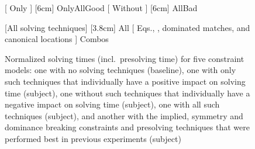 \begin{figure}
  \centering%

                      [%
                        Only %
                      ]%
                      [6cm]%
                      {OnlyAllGood}%
  \hfill%
                      [%
                        Without
                      ]%
                      [6cm]%
                      {AllBad}%

  \vspace{\betweensubfigures}

                      [All solving techniques]%
                      [3.8cm]%
                      {All}%
  \hfill%
                      [%
                        Eqs.\thinspace{},
                        ,
                        dominated matches, and canonical locations%
                      ]%
                      {Combos}

  \caption[%
            Plot for evaluating the impact on solving time made by different
            combinations of solving techniques%
          ]%
          {%
            Normalized solving times (incl.\ presolving time) for five
            constraint models: one with no solving techniques (baseline), one
            with only such techniques that individually have a positive impact
            on solving time (subject), one without such techniques that
            individually have a negative impact on solving time (subject), one
            with all such techniques (subject), and another with the
            implied, symmetry and dominance breaking constraints
            and presolving techniques that were performed best in previous
            experiments (subject)%
          }
\end{figure}

